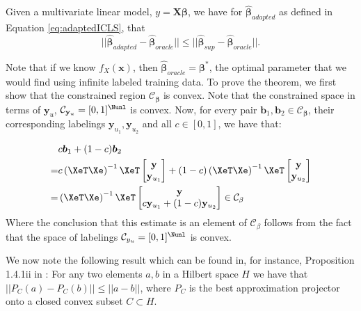 \begin{theorem}
Given a multivariate linear model, $y = \boldsymbol{X} \boldsymbol{{\beta}}$, we have for $\boldsymbol{\hat{\beta}}_{adapted}$ as defined in Equation \eqref{eq:adaptedICLS}, that  
\begin{equation}
||\boldsymbol{\hat{\beta}}_{adapted}-\boldsymbol{\hat{\beta}}_{oracle}|| \leq ||\boldsymbol{\hat{\beta}}_{sup}-\boldsymbol{\hat{\beta}}_{oracle}||.
\end{equation}
\end{theorem}

Note that if we know $f_X(\boldsymbol{x})$, then $\boldsymbol{\hat{\beta}}_{oracle}=\boldsymbol{{\beta}}^\ast$, the optimal parameter that we would find using infinite labeled training data. To prove the theorem, we first show that the constrained region $\mathcal{C}_{\boldsymbol{\beta}}$ is convex. Note that the constrained space in terms of $\mathbf{y}_u$, $\mathcal{C}_{\mathbf{y}_u}=[0,1]^{\Nunl}$ is convex. Now, for every pair $\boldsymbol{b}_1, \boldsymbol{b}_2 \in \mathcal{C}_{\boldsymbol{\beta}}$, their corresponding labelings $\mathbf{y}_{u_1}, \mathbf{y}_{u_2}$ and all $c \in [0,1]$, we have that: 

\begin{equation}
\begin{aligned}
&c \boldsymbol{b}_1 + (1-c) \boldsymbol{b}_2 \\
=&c \left( {\XeT} {\Xe} \right)^{-1} {\XeT} \begin{bmatrix} \mathbf{y}  \\ \mathbf{y}_{u_1} \end{bmatrix} + (1-c) \left( {\XeT} {\Xe} \right)^{-1} {\XeT} \begin{bmatrix} \mathbf{y}  \\ \mathbf{y}_{u_2} \end{bmatrix} \\
=&\left( {\XeT} {\Xe} \right)^{-1} {\XeT} \begin{bmatrix} \mathbf{y}  \\ c \mathbf{y}_{u_1} + (1-c) \mathbf{y}_{u_2}  \end{bmatrix} \in \mathcal{C}_{\beta}
\end{aligned}
\end{equation}
Where the conclusion that this estimate is an element of $\mathcal{C}_{\beta}$ follows from the fact that the space of labelings $\mathcal{C}_{y_u}=[0,1]^{\Nunl}$ is convex. 

We now note the following result which can be found in, for instance, Proposition 1.4.1ii in \cite[p.17]{Aubin2000}: For any two elements $a,b$ in a Hilbert space $H$ we have that $||P_C(a)-P_C(b)|| \leq ||a-b||$, where $P_C$ is the best approximation projector onto a closed convex subset $C \subset H$.


